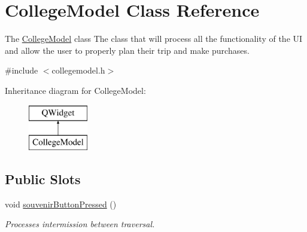 \hypertarget{class_college_model}{}\section{College\+Model Class Reference}
\label{class_college_model}


The \mbox{\hyperlink{class_college_model}{College\+Model}} class The class that will process all the functionality of the UI and allow the user to properly plan their trip and make purchases.  




{\ttfamily \#include $<$collegemodel.\+h$>$}

Inheritance diagram for College\+Model\+:\begin{figure}[H]
\begin{center}
\leavevmode
\includegraphics[height=2.000000cm]{class_college_model}
\end{center}
\end{figure}
\subsection*{Public Slots}
\begin{DoxyCompactItemize}
\item 
void \mbox{\hyperlink{class_college_model_a77fd4ae5151724440b68f236305ff74e}{souvenir\+Button\+Pressed}} ()
\begin{DoxyCompactList}\small\item\em Processes intermission between traversal. \end{DoxyCompactList}\end{DoxyCompactItemize}
